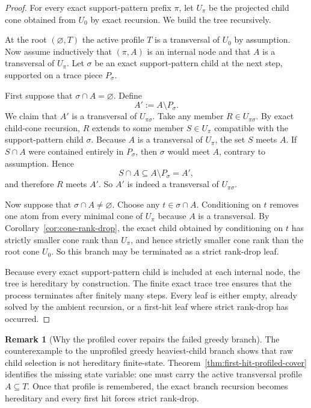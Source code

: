 \documentclass[11pt]{article}
\theoremstyle{definition}
\newtheorem{remark}[theorem]{Remark}
\newcommand{\1}{\mathbf{1}}
\begin{document}
\begin{proof}
For every exact support-pattern prefix $\pi$, let $U_\pi$ be the projected child cone obtained from $U_0$ by exact recursion.
We build the tree recursively.

At the root $(\varnothing,T)$ the active profile $T$ is a transversal of $U_0$ by assumption.
Now assume inductively that $(\pi,A)$ is an internal node and that $A$ is a transversal of $U_\pi$.
Let $\sigma$ be an exact support-pattern child at the next step, supported on a trace piece $P_\sigma$.

First suppose that $\sigma\cap A=\varnothing$.
Define
\[
A':=A\setminus P_\sigma.
\]
We claim that $A'$ is a transversal of $U_{\pi\sigma}$.
Take any member $R\in U_{\pi\sigma}$.
By exact child-cone recursion, $R$ extends to some member $S\in U_\pi$ compatible with the support-pattern child $\sigma$.
Because $A$ is a transversal of $U_\pi$, the set $S$ meets $A$.
If $S\cap A$ were contained entirely in $P_\sigma$, then $\sigma$ would meet $A$, contrary to assumption.
Hence
\[
S\cap A\subseteq A\setminus P_\sigma=A',
\]
and therefore $R$ meets $A'$.
So $A'$ is indeed a transversal of $U_{\pi\sigma}$.

Now suppose that $\sigma\cap A\neq \varnothing$.
Choose any $t\in \sigma\cap A$.
Conditioning on $t$ removes one atom from every minimal cone of $U_\pi$ because $A$ is a transversal.
By Corollary~\ref{cor:cone-rank-drop}, the exact child obtained by conditioning on $t$ has strictly smaller cone rank than $U_\pi$, and hence strictly smaller cone rank than the root cone $U_0$.
So this branch may be terminated as a strict rank-drop leaf.

Because every exact support-pattern child is included at each internal node, the tree is hereditary by construction.
The finite exact trace tree ensures that the process terminates after finitely many steps.
Every leaf is either empty, already solved by the ambient recursion, or a first-hit leaf where strict rank-drop has occurred.
\end{proof}

\begin{remark}[Why the profiled cover repairs the failed greedy branch]\label{rem:first-hit-profiled-cover}
The counterexample to the unprofiled greedy heaviest-child branch shows that raw child selection is not hereditary finite-state.
Theorem~\ref{thm:first-hit-profiled-cover} identifies the missing state variable:
one must carry the active transversal profile $A\subseteq T$.
Once that profile is remembered, the exact branch recursion becomes hereditary and every first hit forces strict rank-drop.
\end{remark}
\end{document}
